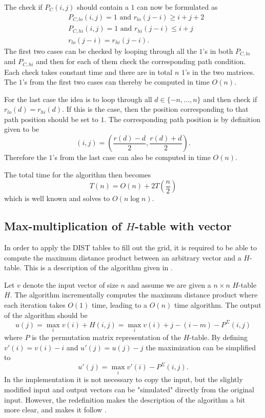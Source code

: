 \documentclass[twoside,11pt,openright]{report}
\begin{document}
%
The check if $P_C(i, j)$ should contain a $1$ can now be formulated as
\begin{align}
  &P_{C,lo}(i, j) = 1 \text{ and } r_{lo}(j - i) \geq i + j + 2 \\
  &P_{C,hi}(i, j) = 1 \text{ and } r_{hi}(j - i) \leq i + j \\
  &r_{lo}(j - i) = r_{hi}(j - i).
\end{align}
The first two cases can be checked by looping through all the $1$'s in both $P_{C,lo}$ and $P_{C,hi}$ and then for each of them check the corresponding path condition. Each check takes constant time and there are in total $n$ $1$'s in the two matrices. The $1$'s from the first two cases can thereby be computed in time $O(n)$.

For the last case the idea is to loop through all $d \in \{-n, \dots, n\}$ and then check if $r_{lo}(d) = r_{hi}(d)$. If this is the case, then the position corresponding to that path position should be set to $1$. The corresponding path position is by definition given to be
\[
  (i, j) = \left( \frac{r(d) - d}{2}, \frac{r(d) + d}{2} \right).
\]
Therefore the $1$'s from the last case can also be computed in time $O(n)$.

The total time for the algorithm then becomes
\[
  T(n) = O(n) + 2 T\left(\frac{n}{2}\right)
\]
which is well known and solves to $O(n \log{n})$.

\subsection{Max-multiplication of $H$-table with vector}
\label{sec:algorithm:max-mult-H-table-with-vector}
In order to apply the DIST tables to fill out the grid, it is required to be able to compute the maximum distance product between an arbitrary vector and a $H$-table. This is a description of the algorithm given in \cite[Lemma 2, p. 234]{Gawrychowski:2012:FAC:2422024.2422048}.

Let $v$ denote the input vector of size $n$ and assume we are given a $n \times n$ $H$-table $H$. The algorithm incrementally computes the maximum distance product where each iteration takes $O(1)$ time, leading to a $O(n)$ time algorithm. The output of the algorithm should be
\[
  u(j) = \max_i v(i) + H(i, j) = \max_i v(i) + j - (i - m) - P^{\Sigma}(i, j)
\]
where $P$ is the permutation matrix representation of the $H$-table. By defining $v'(i) = v(i) - i$ and $u'(j) = u(j) - j$ the maximization can be simplified to
\[
  u'(j) = \max_i v'(i) - P^{\Sigma}(i, j).
\]
In the implementation it is not necessary to copy the input, but the slightly modified input and output vectors can be "simulated" directly from the original input. However, the redefinition makes the description of the algorithm a bit more clear, and makes it follow \cite[Lemma 2, p. 234]{Gawrychowski:2012:FAC:2422024.2422048}.
\end{document}
